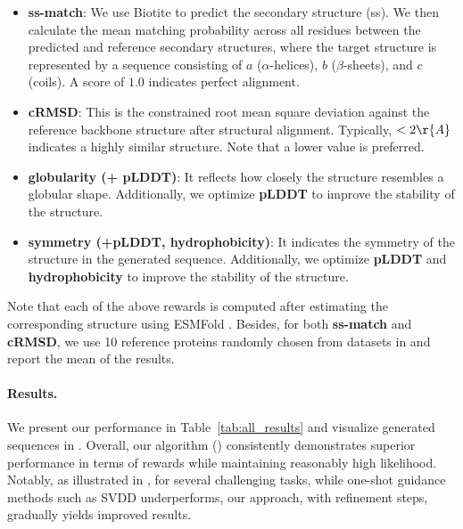 \begin{itemize}
    \item \textbf{ss-match}: We use Biotite \citep{kunzmann2018biotite} to predict the secondary structure (ss). We then calculate the mean matching probability across all residues between the predicted and reference secondary structures, where the target structure is represented by a sequence consisting of $a$ ($\alpha$-helices), $b$ ($\beta$-sheets), and $c$ (coils). A score of $1.0$ indicates perfect alignment.
    \item \textbf{cRMSD}: This is the constrained root mean square deviation against the reference backbone structure after structural alignment. Typically, $<2\r{A}$ indicates a highly similar structure. Note that a lower value is preferred. 
    \item \textbf{globularity (+ pLDDT)}: It reflects how closely the structure resembles a globular shape. Additionally, we optimize \textbf{pLDDT} to improve the stability of the structure.
    \item \textbf{symmetry (+pLDDT, hydrophobicity)}: It indicates the symmetry of the structure in the generated sequence. Additionally, we optimize \textbf{pLDDT} and \textbf{hydrophobicity} to improve the stability of the structure.
\end{itemize}
Note that each of the above rewards is computed after estimating the corresponding structure using ESMFold \citep{lin2023evolutionary}. Besides, for both \textbf{ss-match} and \textbf{cRMSD}, we use 10 reference proteins randomly chosen from datasets in \citet{dauparas2022robust} and report the mean of the results. 







\vspace{-2mm}

\paragraph{Results.} We present our performance in Table~\ref{tab:all_results} and visualize generated sequences in . Overall, our algorithm (\alg) consistently demonstrates superior performance in terms of rewards while maintaining reasonably high likelihood. Notably, as illustrated in , for several challenging tasks, while one-shot guidance methods such as SVDD underperforms, our approach, with refinement steps, gradually yields improved results.






